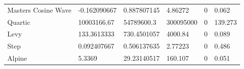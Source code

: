 \documentclass[12pt]{article}
\begin{document}
\begin{table}[h]
\begin{tabular}{llllll}
				Masters Cosine Wave  & -0.162090667     & 0.887807145       & 4.86272        & 0               & 0.062          \\
				Quartic                 & 10003166.67      & 54789600.3        & 300095000      & 0               & 139.273        \\
				Levy                    & 133.3613333      & 730.4501057       & 4000.84        & 0               & 0.089          \\
				Step                    & 0.092407667      & 0.506137635       & 2.77223        & 0               & 0.486          \\
				Alpine                  & 5.3369           & 29.23140517       & 160.107        & 0               & 0.051          \\
				\hline
			\end{tabular}
		\end{table}
	\newpage
\end{document}
